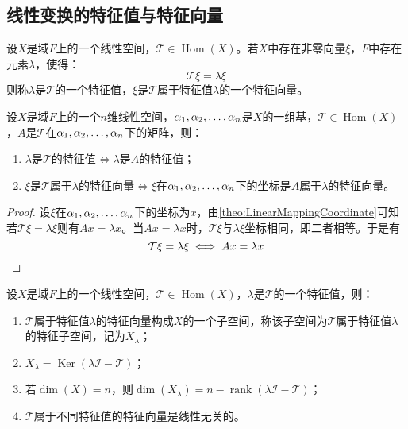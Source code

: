 \subsection{线性变换的特征值与特征向量}
\begin{definition}
	设$X$是域$F$上的一个线性空间，$\mathcal{T}\in\operatorname{Hom}(X)$。若$X$中存在非零向量$\xi$，$F$中存在元素$\lambda$，使得：
	\begin{equation*}
		\mathcal{T}\xi=\lambda\xi
	\end{equation*}
	则称$\lambda$是$\mathcal{T}$的一个特征值，$\xi$是$\mathcal{T}$属于特征值$\lambda$的一个特征向量。
\end{definition}
\begin{theorem}\label{theo:LinearlyTransformationEigen}
	设$X$是域$F$上的一个$n$维线性空间，$\alpha_1, \alpha_2, \dots, \alpha_{n}$是$X$的一组基，$\mathcal{T}\in\operatorname{Hom}(X)$，$A$是$\mathcal{T}$在$\alpha_1, \alpha_2, \dots, \alpha_{n}$下的矩阵，则：
	\begin{enumerate}
		\item $\lambda$是$\mathcal{T}$的特征值$\iff\lambda$是$A$的特征值；
		\item $\xi$是$\mathcal{T}$属于$\lambda$的特征向量$\iff \xi$在$\alpha_1, \alpha_2, \dots, \alpha_{n}$下的坐标是$A$属于$\lambda$的特征向量。
	\end{enumerate}
\end{theorem}
\begin{proof}
	设$\xi$在$\alpha_1, \alpha_2, \dots, \alpha_{n}$下的坐标为$x$，由\cref{theo:LinearMappingCoordinate}可知若$\mathcal{T}\xi=\lambda\xi$则有$Ax=\lambda x$。当$Ax=\lambda x$时，$\mathcal{T}\xi$与$\lambda\xi$坐标相同，即二者相等。于是有
	\begin{equation*}
		\mathcal{T}\xi=\lambda\xi\iff Ax=\lambda x\qedhere
	\end{equation*}
\end{proof}
\begin{property}\label{prop:EigenvectorLinearlyTransformation}
	设$X$是域$F$上的一个线性空间，$\mathcal{T}\in\operatorname{Hom}(X)$，$\lambda$是$\mathcal{T}$的一个特征值，则：
	\begin{enumerate}
		\item $\mathcal{T}$属于特征值$\lambda$的特征向量构成$X$的一个子空间，称该子空间为$\mathcal{T}$属于特征值$\lambda$的特征子空间，记为$X_{\lambda}$；
		\item $X_{\lambda}=\operatorname{Ker}(\lambda\mathcal{I}-\mathcal{T})$；
		\item 若$\dim(X)=n$，则$\dim(X_{\lambda})=n-\operatorname{rank}(\lambda\mathcal{I}-\mathcal{T})$；
		\item $\mathcal{T}$属于不同特征值的特征向量是线性无关的。
	\end{enumerate}
\end{property}
